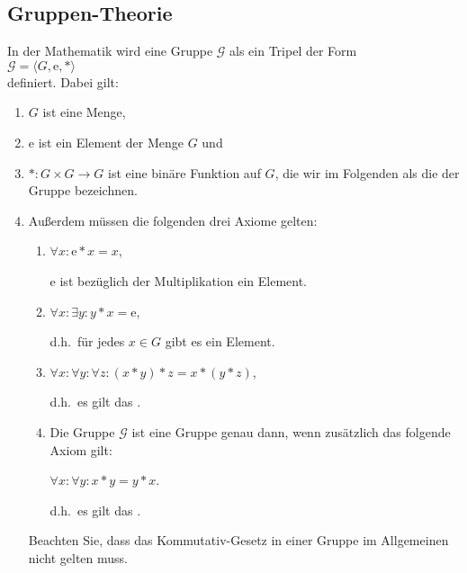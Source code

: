 \subsection{Gruppen-Theorie}
In der Mathematik wird eine Gruppe $\mathcal{G}$  als ein Tripel der Form
\\[0.2cm]
\hspace*{1.3cm}
$\mathcal{G} = \langle G, \mathrm{e}, * \rangle$
\\[0.2cm]
definiert.  Dabei gilt:
\begin{enumerate}
\item $G$ ist eine Menge,
\item $\mathrm{e}$ ist ein Element der Menge $G$ und
\item $*:G \times G \rightarrow G$ ist eine binäre Funktion auf $G$, die wir im Folgenden als die
       der Gruppe be\-zeich\-nen.
\item Außerdem müssen die folgenden drei Axiome gelten:
      \begin{enumerate}
      \item $\forall x: \mathrm{e} * x = x$,
        
            $\mathrm{e}$ ist bezüglich der Multiplikation ein  Element.
      \item $\forall x: \exists{y}: y * x = \mathrm{e}$,

            d.h.~für jedes $x \in G$ gibt es ein  Element. 
      \item $\forall x: \forall y: \forall z: (x * y) * z = x * (y * z)$,

            d.h.~es gilt das .

      \item Die Gruppe $\mathcal{G}$ ist eine  Gruppe genau dann, wenn zusätzlich das folgende Axiom gilt:
        
            $\forall x: \forall y: x * y = y * x$.

            d.h.~es gilt das . \eox
      \end{enumerate}
      Beachten Sie, dass das Kommutativ-Gesetz in einer Gruppe im Allgemeinen nicht gelten muss.
\end{enumerate}


